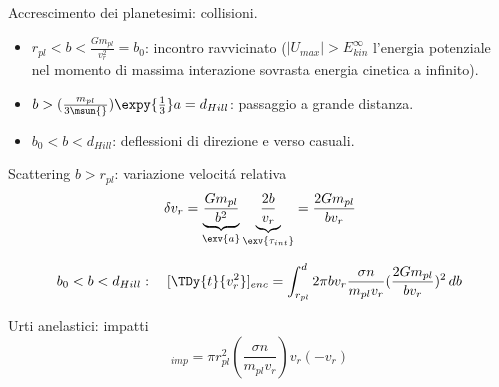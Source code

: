 \begin{frame}{Accrescimento dei planetesimi: collisioni.}
\begin{itemize}
\item $r_{pl}<b<\frac{Gm_{pl}}{v_r^2}=b_0$: incontro ravvicinato ($|U_{max}|>E_{kin}^{\infty}$ l'energia potenziale nel momento di massima interazione sovrasta energia cinetica a infinito).
\item $b>(\frac{m_{pl}}{3\msun{}})\expy{\frac{1}{3}}a=d_{Hill}$: passaggio a grande distanza.
\item $b_0<b<d_{Hill}$: deflessioni di direzione e verso casuali.
\end{itemize}
\begin{block}{Scattering $b>r_{pl}$: variazione velocit\'a relativa}
\begin{equation*}
\delta v_r=\underbrace{\frac{Gm_{pl}}{b^2}}_{\exv{a}}\underbrace{\frac{2b}{v_r}}_{\exv{\tau_{int}}}=\frac{2Gm_{pl}}{bv_r}
\end{equation*}
\end{block}
\begin{equation*}
b_0<b<d_{Hill}:\quad [\TDy{t}{v_r^2}]_{enc}=\int_{r_{pl}}^d2\pi bv_r\frac{\sigma n}{m_{pl}v_r}(\frac{2Gm_{pl}}{bv_r})^2\,db
\end{equation*}
\begin{block}{Urti anelastici: impatti}
\begin{equation*}
[\TDy{t}{v_r^2}]_{imp}=\pi r_{pl}^2(\frac{\sigma n}{m_{pl}v_r})v_r(-v_r)
\end{equation*}
\end{block}
\end{frame}